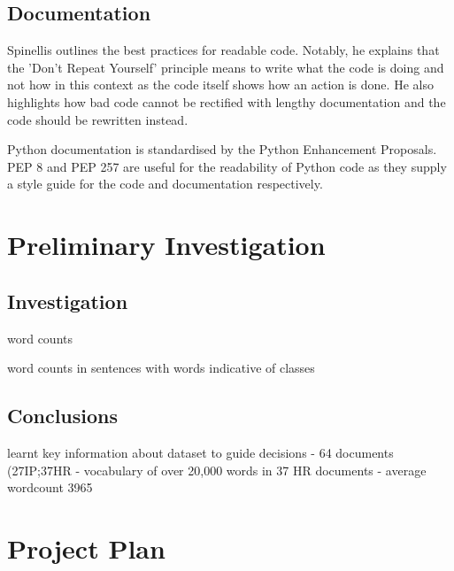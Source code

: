 		\subsection{Documentation}
			Spinellis outlines the best practices for readable code\cite{code_documentation_spinellis}. Notably, he explains that the 'Don't Repeat Yourself' principle means to write what the code is doing and not how in this context as the code itself shows how an action is done. He also highlights how bad code cannot be rectified with lengthy documentation and the code should be rewritten instead.
			
			Python documentation is standardised by the Python Enhancement Proposals. PEP 8 and PEP 257 are useful for the readability of Python code as they supply a style guide for the code and documentation respectively.
	\section{Preliminary Investigation}
		\subsection{Investigation}
			word counts
			
			word counts in sentences with words indicative of classes
		\subsection{Conclusions}
			learnt key information about dataset to guide decisions - 64 documents (27IP;37HR - vocabulary of over 20,000 words in 37 HR documents - average wordcount 3965
	\section{Project Plan}
